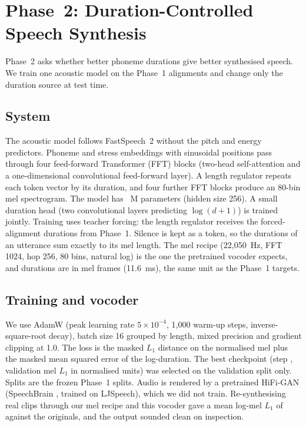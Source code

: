 \section{Phase~2: Duration-Controlled Speech Synthesis}\label{sec:phase2}
Phase~2 asks whether better phoneme durations give better synthesised speech. We train one acoustic model on the Phase~1 alignments and change only the duration source at test time.

\subsection{System}
The acoustic model follows FastSpeech~2 \cite{ren2021} without the pitch and energy predictors. Phoneme and stress embeddings with sinusoidal positions pass through four feed-forward Transformer (FFT) blocks (two-head self-attention and a one-dimensional convolutional feed-forward layer). A length regulator repeats each token vector by its duration, and four further FFT blocks produce an 80-bin mel spectrogram. The model has \ptParams{}~M parameters (hidden size 256). A small duration head (two convolutional layers predicting $\log(d{+}1)$) is trained jointly. Training uses teacher forcing: the length regulator receives the forced-alignment durations from Phase~1. Silence is kept as a token, so the durations of an utterance sum exactly to its mel length. The mel recipe (22{,}050~Hz, FFT 1024, hop 256, 80 bins, natural log) is the one the pretrained vocoder expects, and durations are in mel frames (11.6~ms), the same unit as the Phase~1 targets.

\subsection{Training and vocoder}
We use AdamW (peak learning rate $5\!\times\!10^{-4}$, 1{,}000 warm-up steps, inverse-square-root decay), batch size 16 grouped by length, mixed precision and gradient clipping at 1.0. The loss is the masked $L_1$ distance on the normalised mel plus the masked mean squared error of the log-duration. The best checkpoint (step \ptStep{}, validation mel $L_1$ \ptValMel{} in normalised units) was selected on the validation split only. Splits are the frozen Phase~1 splits. Audio is rendered by a pretrained HiFi-GAN \cite{kong2020} (SpeechBrain \cite{ravanelli2021}, trained on LJSpeech), which we did not train. Re-synthesising real clips through our mel recipe and this vocoder gave a mean log-mel $L_1$ of \csMelLone{} against the originals, and the output sounded clean on inspection.

